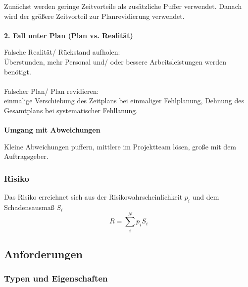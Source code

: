 Zunächst werden geringe Zeitvorteile als zusätzliche Puffer verwendet.
Danach wird der größere Zeitvorteil zur Planrevidierung verwendet.
\\ \\
\textbf{2. Fall unter Plan (Plan vs. Realität)}

Falsche Realität/ Rückstand aufholen:\\
Überstunden, mehr Personal und/ oder bessere Arbeitsleistungen werden benötigt.
\\ \\
Falscher Plan/ Plan revidieren:\\
einmalige Verschiebung des Zeitplans bei einmaliger Fehlplanung, Dehnung des Gesamtplans bei systematischer Fehllanung.
\\ \\
\textbf{Umgang mit Abweichungen}

Kleine Abweichungen puffern, mittlere im Projektteam lösen, große mit dem Auftragsgeber.

\subsubsection{Risiko}

Das Risiko erreichnet sich aus der Risikowahrscheinlichkeit $p_i$ und dem Schadensausmaß $S_i$ $$
    R = \sum_i^N p_i S_i
$$

\subsection{Anforderungen}

\subsubsection{Typen und Eigenschaften}

